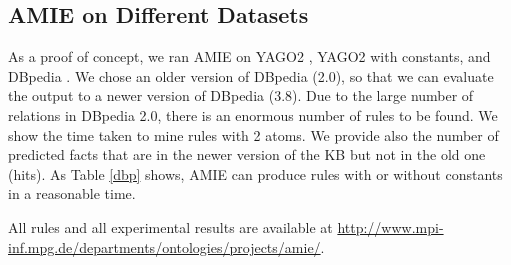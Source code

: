 
\subsection{AMIE on Different Datasets}
As a proof of concept, we ran AMIE on YAGO2 \cite{yago2}, YAGO2 with constants, and DBpedia \cite{dbpedia}. We chose an older version of DBpedia (2.0), so that we can evaluate the output to a newer version of DBpedia (3.8). 
Due to the large number of relations in DBpedia 2.0, there is an enormous number of rules to be found. We show the time taken to mine rules with 2 atoms. 
We provide also the number of predicted facts that are in the newer version of the KB but not in the old one (hits). As Table \ref{dbp} shows, AMIE can produce rules with or without constants in a reasonable time.\\


 \noindent All rules and all experimental results are available at \url{http://www.mpi-inf.mpg.de/departments/ontologies/projects/amie/}.